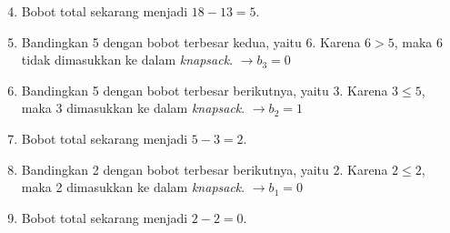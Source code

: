 \documentclass{article}
\begin{document}

\begin{enumerate}
\setcounter{enumi}{3}
\item Bobot total sekarang menjadi $18 - 13 = 5$.
\item Bandingkan 5 dengan bobot terbesar kedua, yaitu 6. Karena $6 > 5$, maka 6 tidak dimasukkan ke dalam \textit{knapsack}. $\rightarrow b_3 = 0$
\item Bandingkan 5 dengan bobot terbesar berikutnya, yaitu 3. Karena $3 \le 5$, maka 3 dimasukkan ke dalam \textit{knapsack}. $\rightarrow b_2 = 1$
\item Bobot total sekarang menjadi $5 - 3 = 2$.
\item Bandingkan 2 dengan bobot terbesar berikutnya, yaitu 2. Karena $2 \le 2$, maka 2 dimasukkan ke dalam \textit{knapsack}. $\rightarrow b_1 = 0$
\item Bobot total sekarang menjadi $2 - 2 = 0$.
\end{enumerate}
\end{document}
